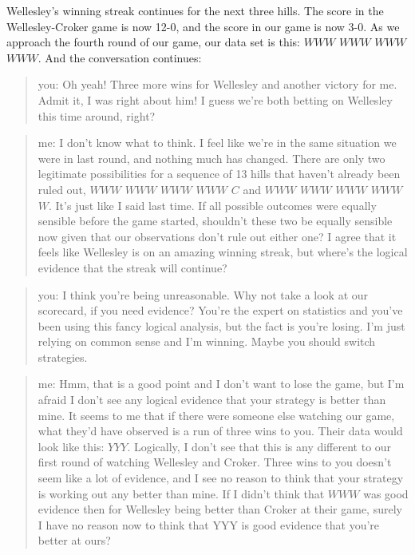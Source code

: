 \documentclass[
  a4paper,
]{book}
\begin{document}
Wellesley's winning streak continues for the next three hills. The score
in the Wellesley-Croker game is now 12-0, and the score in our game is
now 3-0. As we approach the fourth round of our game, our data set is
this: \(WWW\) \(WWW\) \(WWW\) \(WWW\). And the conversation continues:

\begin{quote}
you: Oh yeah! Three more wins for Wellesley and another victory for me.
Admit it, I was right about him! I guess we're both betting on Wellesley
this time around, right?
\end{quote}

\begin{quote}
me: I don't know what to think. I feel like we're in the same situation
we were in last round, and nothing much has changed. There are only two
legitimate possibilities for a sequence of 13 hills that haven't already
been ruled out, \(WWW\) \(WWW\) \(WWW\) \(WWW\) \(C\) and \(WWW\)
\(WWW\) \(WWW\) \(WWW\) \(W\). It's just like I said last time. If all
possible outcomes were equally sensible before the game started,
shouldn't these two be equally sensible now given that our observations
don't rule out either one? I agree that it feels like Wellesley is on an
amazing winning streak, but where's the logical evidence that the streak
will continue?
\end{quote}

\begin{quote}
you: I think you're being unreasonable. Why not take a look at our
scorecard, if you need evidence? You're the expert on statistics and
you've been using this fancy logical analysis, but the fact is you're
losing. I'm just relying on common sense and I'm winning. Maybe you
should switch strategies.
\end{quote}

\begin{quote}
me: Hmm, that is a good point and I don't want to lose the game, but I'm
afraid I don't see any logical evidence that your strategy is better
than mine. It seems to me that if there were someone else watching our
game, what they'd have observed is a run of three wins to you. Their
data would look like this: \(YYY\). Logically, I don't see that this is
any different to our first round of watching Wellesley and Croker. Three
wins to you doesn't seem like a lot of evidence, and I see no reason to
think that your strategy is working out any better than mine. If I
didn't think that \(WWW\) was good evidence then for Wellesley being
better than Croker at their game, surely I have no reason now to think
that YYY is good evidence that you're better at ours?
\end{quote}
\end{document}
